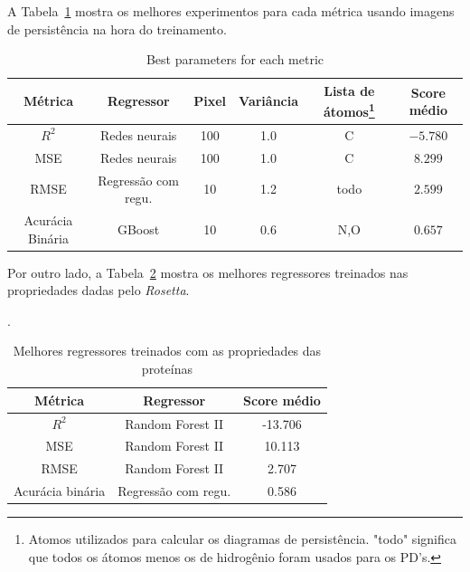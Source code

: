 A Tabela~\ref{tab:bestruns} mostra os melhores experimentos para cada métrica usando imagens de persistência na hora do treinamento.
\begin{table}[!htbp]
    \centering
    \caption{Best parameters for each metric}
    \label{tab:bestruns}
    \begin{tabular}{@{}cccccc@{}}
    \toprule
    \textbf{Métrica} & \textbf{Regressor} & \textbf{Pixel} & \textbf{Variância} &
    \textbf{Lista de átomos}\footnote{Atomos utilizados para calcular os diagramas de persistência. "todo" significa
    que todos os átomos menos os de hidrogênio foram usados para os PD's.}
     & Score médio
    \\
    \midrule
    $R^2$           & Redes neurais     & 100       & 1.0             & C     &  $-5.780$ \\
    MSE             & Redes neurais     & 100       & 1.0             & C     &  $8.299$  \\
    RMSE            & Regressão com regu.   & 10        & 1.2             & todo &  $2.599$  \\
    Acurácia Binária & GBoost             & 10        & 0.6             & N,O   &  $0.657$  \\
    \bottomrule
    \end{tabular}
\end{table}
Por outro lado, a Tabela~\ref{tab:rosregr} mostra os melhores regressores treinados 
nas propriedades dadas pelo \textit{Rosetta}. 
\begin{table}[!htbp]
    \centering
    \caption{Melhores regressores treinados com as propriedades das proteínas}.
    \label{tab:rosregr}
    \begin{tabular}{@{}ccc@{}}
        \toprule
        \textbf{Métrica} & \textbf{Regressor} & \textbf{Score médio} \\ \midrule
        $R^2$           & Random Forest II   & -13.706        \\
        MSE             & Random Forest II   & 10.113         \\
        RMSE            & Random Forest II   & 2.707          \\
        Acurácia binária & Regressão com regu. & 0.586          \\ \bottomrule
    \end{tabular}
\end{table}

